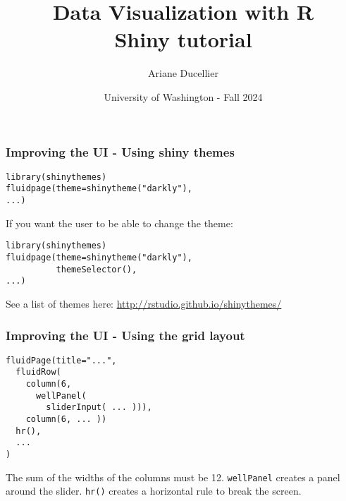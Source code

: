 \documentclass{beamer}
\title[Data Visualization with R - Shiny tutorial]{Data Visualization with R \\ Shiny tutorial}
\author{Ariane Ducellier}
\date{University of Washington - Fall 2024}
\begin{document}
	\begin{frame}
		\titlepage
	\end{frame}

	\begin{frame}[fragile]
		\frametitle{Improving the UI - Using shiny themes}
		
		\begin{exampleblock}{}
		\begin{BVerbatim}
library(shinythemes)
fluidpage(theme=shinytheme("darkly"),
...)
		\end{BVerbatim}
		\end{exampleblock}{}

		\vspace{2em}

		If you want the user to be able to change the theme:
		
		\begin{exampleblock}{}
		\begin{BVerbatim}
library(shinythemes)
fluidpage(theme=shinytheme("darkly"),
          themeSelector(),
...)
		\end{BVerbatim}
		\end{exampleblock}{}

		\vspace{2em}

		See a list of themes here: \href{http://rstudio.github.io/shinythemes/}{http://rstudio.github.io/shinythemes/}
 	
	\end{frame}

	\begin{frame}[fragile]
		\frametitle{Improving the UI - Using the grid layout}
		
		\begin{exampleblock}{}
		\begin{BVerbatim}
fluidPage(title="...",
  fluidRow(
    column(6,
      wellPanel(
        sliderInput( ... ))),
    column(6, ... ))
  hr(),
  ...
)      
		\end{BVerbatim}
		\end{exampleblock}{}

		\vspace{1em}

		The sum of the  widths of the columns must be 12. \verb|wellPanel| creates a panel around the slider. \verb|hr()| creates a horizontal rule to break the screen.

	\end{frame}
\end{document}
